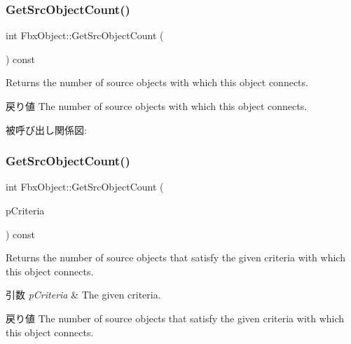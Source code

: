 \subsubsection{\texorpdfstring{Get\+Src\+Object\+Count()}{GetSrcObjectCount()}\hspace{0.1cm}{\footnotesize\ttfamily [1/4]}}
{\footnotesize\ttfamily int Fbx\+Object\+::\+Get\+Src\+Object\+Count (\begin{DoxyParamCaption}{ }\end{DoxyParamCaption}) const}

Returns the number of source objects with which this object connects. \begin{DoxyReturn}{戻り値}
The number of source objects with which this object connects. 
\end{DoxyReturn}
被呼び出し関係図\+:
\mbox{\label{class_fbx_object_aa1fe90887d90288ee0c06121ec79c0a8}} 
\subsubsection{\texorpdfstring{Get\+Src\+Object\+Count()}{GetSrcObjectCount()}\hspace{0.1cm}{\footnotesize\ttfamily [2/4]}}
{\footnotesize\ttfamily int Fbx\+Object\+::\+Get\+Src\+Object\+Count (\begin{DoxyParamCaption}\item[{const \hyperlink{class_fbx_criteria}{Fbx\+Criteria} \&}]{p\+Criteria }\end{DoxyParamCaption}) const}

Returns the number of source objects that satisfy the given criteria with which this object connects. 
\begin{DoxyParams}{引数}
{\em p\+Criteria} & The given criteria. \\
\hline
\end{DoxyParams}
\begin{DoxyReturn}{戻り値}
The number of source objects that satisfy the given criteria with which this object connects. 
\end{DoxyReturn}
\mbox{\label{class_fbx_object_a9da9f905564dc108d1363049eb032fa8}} 
